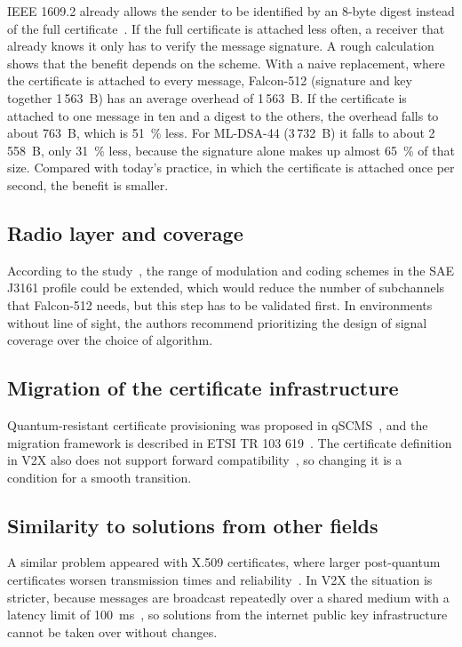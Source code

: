 \documentclass[10pt,twoside,a4paper]{article}
\begin{document}
IEEE 1609.2 already allows the sender to be identified by an 8-byte digest instead of the full certificate~\cite{Abrar:2026}. If the full certificate is attached less often, a receiver that already knows it only has to verify the message signature. A rough calculation shows that the benefit depends on the scheme. With a naive replacement, where the certificate is attached to every message, Falcon-512 (signature and key together 1\,563~B) has an average overhead of 1\,563~B. If the certificate is attached to one message in ten and a digest to the others, the overhead falls to about 763~B, which is 51~\% less. For ML-DSA-44 (3\,732~B) it falls to about 2\,558~B, only 31~\% less, because the signature alone makes up almost 65~\% of that size. Compared with today's practice, in which the certificate is attached once per second, the benefit is smaller.

\subsection{Radio layer and coverage}

According to the study~\cite{Abrar:2026}, the range of modulation and coding schemes in the SAE J3161 profile could be extended, which would reduce the number of subchannels that Falcon-512 needs, but this step has to be validated first. In environments without line of sight, the authors recommend prioritizing the design of signal coverage over the choice of algorithm.

\subsection{Migration of the certificate infrastructure}

Quantum-resistant certificate provisioning was proposed in qSCMS~\cite{Barreto:2018}, and the migration framework is described in ETSI TR 103 619~\cite{ETSI:TR103619}. The certificate definition in V2X also does not support forward compatibility~\cite{Yoshizawa:2023}, so changing it is a condition for a smooth transition.

\subsection{Similarity to solutions from other fields}

A similar problem appeared with X.509 certificates, where larger post-quantum certificates worsen transmission times and reliability~\cite{Kampanakis:2018}. In V2X the situation is stricter, because messages are broadcast repeatedly over a shared medium with a latency limit of 100~ms~\cite{Abrar:2026}, so solutions from the internet public key infrastructure cannot be taken over without changes.
\end{document}
